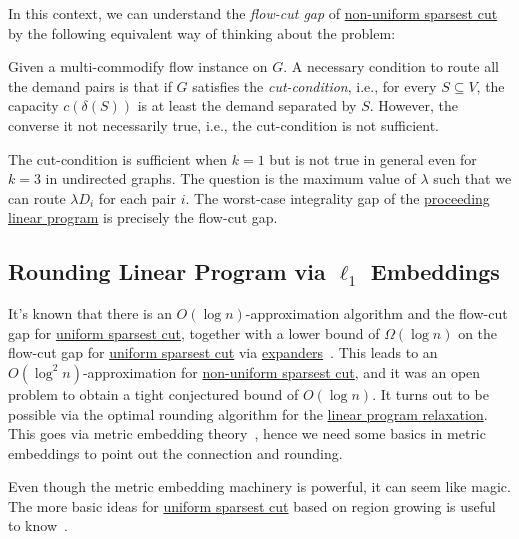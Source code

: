 In this context, we can understand the \emph{flow-cut gap} of \hyperref[prb:non-uniform-sparsest-cut]{non-uniform sparsest cut} by the following equivalent way of thinking about the problem:

\begin{intuition}
	Given a multi-commodify flow instance on \(G\). A necessary condition to route all the demand pairs is that if \(G\) satisfies the \emph{cut-condition}, i.e., for every \(S \subseteq V\), the capacity \(c(\delta (S))\) is at least the demand separated by \(S\). However, the converse it not necessarily true, i.e., the cut-condition is not sufficient.
\end{intuition}

The cut-condition is sufficient when \(k = 1\) but is not true in general even for \(k = 3\) in undirected graphs. The question is the maximum value of \(\lambda \) such that we can route \(\lambda D_i\) for each pair \(i\). The worst-case integrality gap of the \hyperref[eq:non-uniform-sparsest-cut-LP-primal]{proceeding linear program} is precisely the flow-cut gap.

\subsection{Rounding Linear Program via \(\ell _1\) Embeddings}
It's known that there is an \(O(\log n)\)-approximation algorithm and the flow-cut gap for \hyperref[prb:sparsest-cut]{uniform sparsest cut}, together with a lower bound of \(\Omega (\log n)\) on the flow-cut gap for \hyperref[prb:sparsest-cut]{uniform sparsest cut} via \hyperref[def:expander]{expanders}~\cite{leighton1999multicommodity}. This leads to an \(O(\log ^2 n)\)-approximation for \hyperref[prb:non-uniform-sparsest-cut]{non-uniform sparsest cut}, and it was an open problem to obtain a tight conjectured bound of \(O(\log n)\). It turns out to be possible via the optimal rounding algorithm for the \hyperref[eq:non-uniform-sparsest-cut-LP-primal]{linear program relaxation}. This goes via metric embedding theory~\cite{linial1995geometry,aumann1998log}, hence we need some basics in metric embeddings to point out the connection and rounding.

\begin{note}
	Even though the metric embedding machinery is powerful, it can seem like magic. The more basic ideas for \hyperref[prb:sparsest-cut]{uniform sparsest cut} based on region growing is useful to know~\cite{williamson2011design}.
\end{note}

